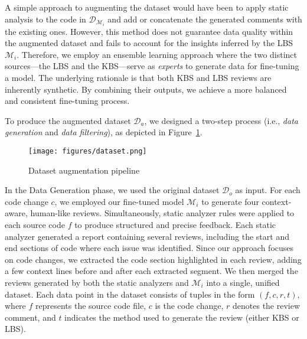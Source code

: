 A simple approach to augmenting the dataset would have been to apply static analysis to the code in \(\mathcal{D}_{\mathcal{M}_i}\) and add or concatenate the generated comments with the existing ones. However, this method does not guarantee data quality within the augmented dataset and fails to account for the insights inferred by the LBS \(\mathcal{M}_i\). 
Therefore, we employ an ensemble learning approach where the two distinct sources—the LBS and the KBS—serve as \emph{experts} to generate data for fine-tuning a model. The underlying rationale is that both KBS and LBS reviews are inherently synthetic. By combining their outputs, we achieve a more balanced and consistent fine-tuning process.

To produce the augmented dataset \(\mathcal{D}_a\), we designed a two-step process (i.e., \emph{data generation} and \emph{data filtering}), as depicted in Figure~\ref{fig:approach}.


\begin{figure}[htbp!]
  \centering
  \texttt{[image: figures/dataset.png]}
  \caption{Dataset augmentation pipeline}
  \label{fig:approach} 
\end{figure}


In the Data Generation phase, we used the original dataset \(\mathcal{D}_o\) as input. For each code change \( c \), we employed our fine-tuned model \(\mathcal{M}_i\) to generate four context-aware, human-like reviews. Simultaneously, static analyzer rules were applied to each source code \( f \) to produce structured and precise feedback. Each static analyzer generated a report containing several reviews, including the start and end sections of code where each issue was identified. Since our approach focuses on code changes, we extracted the code section highlighted in each review, adding a few context lines before and after each extracted segment.
We then merged the reviews generated by both the static analyzers and \(\mathcal{M}_i\) into a single, unified dataset. Each data point in the dataset consists of tuples in the form \( (f, c, r, t) \), where \( f \) represents the source code file, \( c \) is the code change, \( r \) denotes the review comment, and \( t \) indicates the method used to generate the review (either KBS or LBS). 

